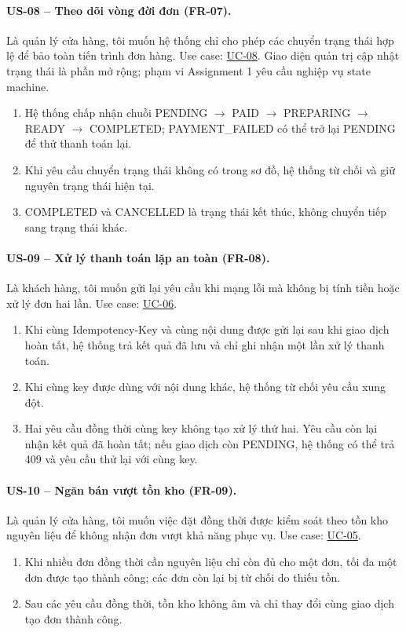 \paragraph{US-08 -- Theo dõi vòng đời đơn (FR-07).}
Là quản lý cửa hàng, tôi muốn hệ thống chỉ cho phép các chuyển trạng thái hợp lệ để bảo toàn tiến trình đơn hàng. Use case: \hyperref[uc08]{UC-08}. Giao diện quản trị cập nhật trạng thái là phần mở rộng; phạm vi Assignment 1 yêu cầu nghiệp vụ state machine.
\begin{enumerate}[label=\textbf{AC\arabic*:},leftmargin=*]
  \item Hệ thống chấp nhận chuỗi PENDING $\rightarrow$ PAID $\rightarrow$ PREPARING $\rightarrow$ READY $\rightarrow$ COMPLETED; PAYMENT\_FAILED có thể trở lại PENDING để thử thanh toán lại.
  \item Khi yêu cầu chuyển trạng thái không có trong sơ đồ, hệ thống từ chối và giữ nguyên trạng thái hiện tại.
  \item COMPLETED và CANCELLED là trạng thái kết thúc, không chuyển tiếp sang trạng thái khác.
\end{enumerate}

\paragraph{US-09 -- Xử lý thanh toán lặp an toàn (FR-08).}
Là khách hàng, tôi muốn gửi lại yêu cầu khi mạng lỗi mà không bị tính tiền hoặc xử lý đơn hai lần. Use case: \hyperref[uc06]{UC-06}.
\begin{enumerate}[label=\textbf{AC\arabic*:},leftmargin=*]
  \item Khi cùng Idempotency-Key và cùng nội dung được gửi lại sau khi giao dịch hoàn tất, hệ thống trả kết quả đã lưu và chỉ ghi nhận một lần xử lý thanh toán.
  \item Khi cùng key được dùng với nội dung khác, hệ thống từ chối yêu cầu xung đột.
  \item Hai yêu cầu đồng thời cùng key không tạo xử lý thứ hai. Yêu cầu còn lại nhận kết quả đã hoàn tất; nếu giao dịch còn PENDING, hệ thống có thể trả 409 và yêu cầu thử lại với cùng key.
\end{enumerate}

\paragraph{US-10 -- Ngăn bán vượt tồn kho (FR-09).}
Là quản lý cửa hàng, tôi muốn việc đặt đồng thời được kiểm soát theo tồn kho nguyên liệu để không nhận đơn vượt khả năng phục vụ. Use case: \hyperref[uc05]{UC-05}.
\begin{enumerate}[label=\textbf{AC\arabic*:},leftmargin=*]
  \item Khi nhiều đơn đồng thời cần nguyên liệu chỉ còn đủ cho một đơn, tối đa một đơn được tạo thành công; các đơn còn lại bị từ chối do thiếu tồn.
  \item Sau các yêu cầu đồng thời, tồn kho không âm và chỉ thay đổi cùng giao dịch tạo đơn thành công.
\end{enumerate}


